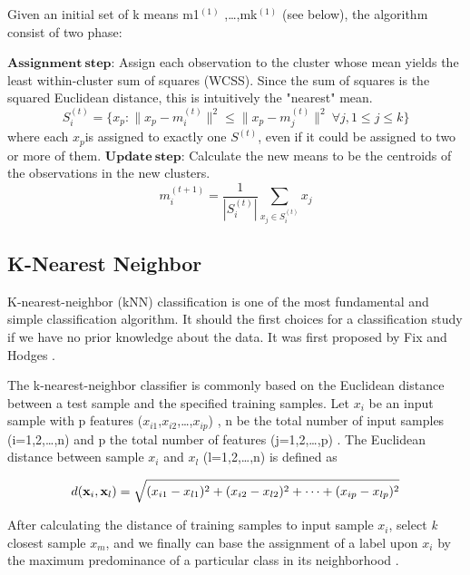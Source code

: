 \documentclass[conference]{IEEEtran}
\begin{document}
Given an initial set of k means m1$^{\left(1\right)}$
,…,mk$^{\left(1\right)}$ (see below), the algorithm consist of two phase:\newline

$\boldsymbol{Assignment\ step}$: Assign each observation to the cluster whose mean yields the least within-cluster sum of squares (WCSS). Since the sum of squares is the squared Euclidean distance, this is intuitively the "nearest" mean.
\begin{equation}
S_i^{(t)} = \big \{ x_p : \big \| x_p - m^{(t)}_i \big \|^2 \le \big \| x_p - m^{(t)}_j \big \|^2 \ \forall j, 1 \le j \le k \big\}
\end{equation}
where each $x_p $is assigned to exactly one $S^{(t)}$, even if it could be assigned to two or more of them.\newline
$\boldsymbol{Update\ step}$: Calculate the new means to be the centroids of the observations in the new clusters.
\begin{equation}
m^{(t+1)}_i = \frac{1}{|S^{(t)}_i|} \sum_{x_j \in S^{(t)}_i} x_j
\end{equation}

\subsection{K-Nearest Neighbor}
K-nearest-neighbor (kNN) classification is one of the most fundamental and simple classification algorithm. It should the first choices for a classification study if we have no prior knowledge about the data. It was first proposed by Fix and Hodges \cite{EvelynFix1951}. 

The k-nearest-neighbor classifier is commonly based on the Euclidean distance between a test sample and the specified training samples. Let $x_i$ be an input sample with p features ($x_{i1}$,$x_{i2}$,…,$x_{ip}$) , n be the total number of input samples (i=1,2,…,n) and p the total number of features (j=1,2,…,p) . The Euclidean distance between sample $x_i$ and $x_l$ (l=1,2,…,n) is defined as

\begin{equation}
d({\textbf x}_i,{\textbf x}_l) = \sqrt{(x_{i1}-x_{l1})^2 + (x_{i2}-x_{l2})^2 + \cdots + (x_{ip}-x_{lp})^2}
\end{equation}

After calculating the distance of training samples to input sample $x_i$, select \textit{k} closest sample $x_m$, and we finally can base the assignment of a label upon $x_i$ by the maximum predominance of a particular class in its neighborhood \cite{Cover1967}.
\end{document}
